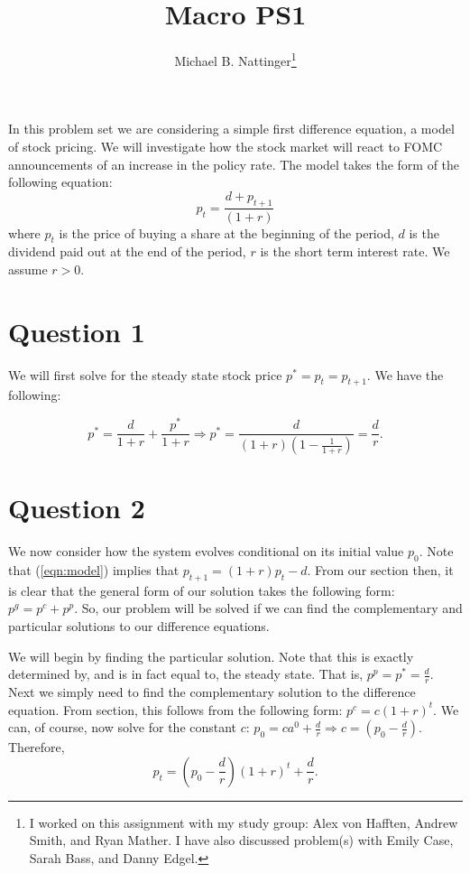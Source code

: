 \documentclass[11pt]{article} %
\title{Macro PS1}
\author{Michael B. Nattinger\footnote{I worked on this assignment with my study group: Alex von Hafften, Andrew Smith, and Ryan Mather. I have also discussed problem(s) with Emily Case, Sarah Bass, and Danny Edgel.}}
\begin{document}
\maketitle
In this problem set we are considering a simple first difference equation, a model of stock pricing. We will investigate how the stock market will react to FOMC announcements of an increase in the policy rate. The model takes the form of the following equation:
\begin{equation}
p_t = \frac{d + p_{t+1}}{(1+r)} \label{eqn:model}
\end{equation}
where $p_t$ is the price of buying a share at the beginning of the period, $d$ is the dividend paid out at the end of the period, $r$ is the short term interest rate. We assume $r>0$.

\section{Question 1}
We will first solve for the steady state stock price $p^{*} = p_t = p_{t+1}.$ We have the following:

\begin{equation*}
p^{*} = \frac{d}{1+r} + \frac{p^{*}}{1+r} \Rightarrow p^{*} = \frac{d}{(1+r)(1-\frac{1}{1+r})} = \frac{d}{r}.
\end{equation*}

\section{Question 2}
We now consider how the system evolves conditional on its initial value $p_0$. Note that (\ref{eqn:model}) implies that $p_{t+1} = (1+r)p_t - d.$ From our section then, it is clear that the general form of our solution takes the following form: $p^{g} = p^{c} + p^{p}$. So, our problem will be solved if we can find the complementary and particular solutions to our difference equations.

We will begin by finding the particular solution. Note that this is exactly determined by, and is in fact equal to, the steady state. That is, $p^{p} = p^{*} = \frac{d}{r}$. Next we simply need to find the complementary solution to the difference equation. From section, this follows from the following form: $p^{c} = c (1+r)^t$. We can, of course, now solve for the constant $c$: $p_0 = c a^0 + \frac{d}{r} \Rightarrow c = \left( p_0 - \frac{d}{r} \right).$ Therefore,
\begin{equation}
p_{t} = \left( p_0 - \frac{d}{r} \right) (1+r)^t + \frac{d}{r}. \label{eqn:soln}
\end{equation}
\end{document}
